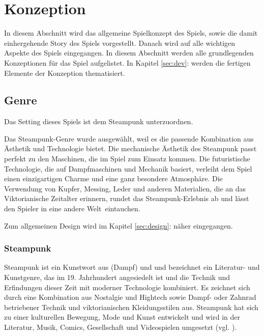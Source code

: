 \chapter{Konzeption}\label{sec:concept}
In diesem Abschnitt wird das allgemeine Spielkonzept des Spiels, sowie die damit einhergehende Story des Spiels vorgestellt. Danach wird auf alle wichtigen Aspekte des Spiels eingegangen. In diesem Abschnitt werden alle grundlegenden Konzeptionen für das Spiel aufgelistet. In Kapitel \ref{sec:dev}:  werden die fertigen Elemente der Konzeption thematisiert.

\section{Genre}
Das Setting dieses Spiels ist dem Steampunk unterzuordnen.

Das Steampunk-Genre wurde ausgewählt, weil es die passende Kombination aus Ästhetik und Technologie bietet. Die mechanische Ästhetik des Steampunk passt perfekt zu den Maschinen, die im Spiel zum Einsatz kommen. Die futuristische Technologie, die auf Dampfmaschinen und Mechanik basiert, verleiht dem Spiel einen einzigartigen Charme und eine ganz besondere Atmosphäre. Die Verwendung von Kupfer, Messing, Leder und anderen Materialien, die an das Viktorianische Zeitalter erinnern, rundet das Steampunk-Erlebnis ab und lässt den Spieler in eine andere Welt eintauchen.

Zum allgemeinen Design wird im Kapitel \ref{sec:design}:  näher eingegangen.

\subsection{Steampunk}
Steampunk ist ein Kunstwort aus  (Dampf) und  und bezeichnet ein Literatur- und Kunstgenre, das im 19. Jahrhundert angesiedelt ist und die Technik und Erfindungen dieser Zeit mit moderner Technologie kombiniert. Es zeichnet sich durch eine Kombination aus Nostalgie und Hightech sowie Dampf- oder Zahnrad betriebener Technik und viktorianischen Kleidungsstilen aus. Steampunk hat sich zu einer kulturellen Bewegung, Mode und Kunst entwickelt und wird in der Literatur, Musik, Comics, Gesellschaft und Videospielen umgesetzt (vgl. \cite{noauthor_steampunk_nodate}).

